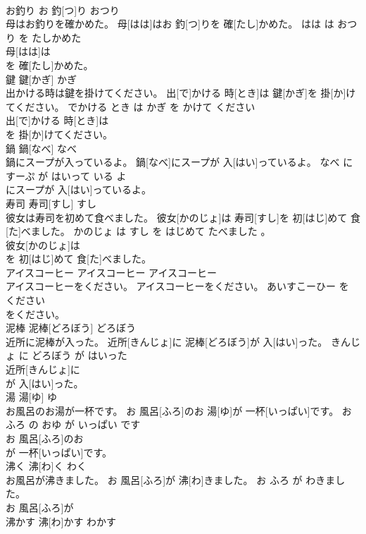 \documentclass[8pt]{extreport}
\begin{document}
\begin{CJK}{UTF8}{min}
\\	お釣り	お 釣[つ]り	おつり	
\\	母はお釣りを確かめた。	母[はは]はお 釣[つ]りを 確[たし]かめた。	はは は おつり を たしかめた	
\\	母[はは]は
\\	を 確[たし]かめた。		
\\	鍵	鍵[かぎ]	かぎ	
\\	出かける時は鍵を掛けてください。	出[で]かける 時[とき]は 鍵[かぎ]を 掛[か]けてください。	でかける とき は かぎ を かけて ください	
\\	出[で]かける 時[とき]は
\\	を 掛[か]けてください。		
\\	鍋	鍋[なべ]	なべ	
\\	鍋にスープが入っているよ。	鍋[なべ]にスープが 入[はい]っているよ。	なべ に すーぷ が はいって いる よ	
\\	にスープが 入[はい]っているよ。		
\\	寿司	寿司[すし]	すし	
\\	彼女は寿司を初めて食べました。	彼女[かのじょ]は 寿司[すし]を 初[はじ]めて 食[た]べました。	かのじょ は すし を はじめて たべました 。	
\\	彼女[かのじょ]は
\\	を 初[はじ]めて 食[た]べました。		
\\	アイスコーヒー	アイスコーヒー	アイスコーヒー	
\\	アイスコーヒーをください。	アイスコーヒーをください。	あいすこーひー を ください	
\\	をください。		
\\	泥棒	泥棒[どろぼう]	どろぼう	
\\	近所に泥棒が入った。	近所[きんじょ]に 泥棒[どろぼう]が 入[はい]った。	きんじょ に どろぼう が はいった	
\\	近所[きんじょ]に
\\	が 入[はい]った。		
\\	湯	湯[ゆ]	ゆ	
\\	お風呂のお湯が一杯です。	お 風呂[ふろ]のお 湯[ゆ]が 一杯[いっぱい]です。	おふろ の おゆ が いっぱい です	
\\	お 風呂[ふろ]のお
\\	が 一杯[いっぱい]です。		
\\	沸く	沸[わ]く	わく	
\\	お風呂が沸きました。	お 風呂[ふろ]が 沸[わ]きました。	お ふろ が わきました。	
\\	お 風呂[ふろ]が
\\	沸かす	沸[わ]かす	わかす	

\end{CJK}
\end{document}
